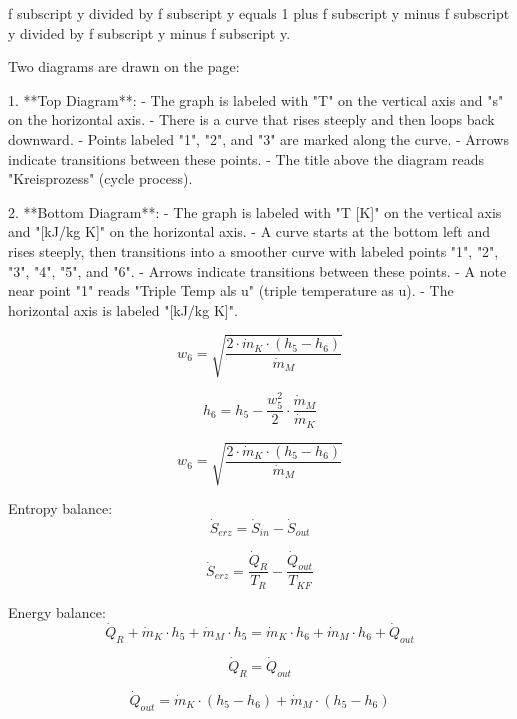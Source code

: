 f subscript y divided by f subscript y equals 1 plus f subscript y minus f subscript y divided by f subscript y minus f subscript y.

Two diagrams are drawn on the page:

1. **Top Diagram**:  
   - The graph is labeled with "T" on the vertical axis and "s" on the horizontal axis.  
   - There is a curve that rises steeply and then loops back downward.  
   - Points labeled "1", "2", and "3" are marked along the curve.  
   - Arrows indicate transitions between these points.  
   - The title above the diagram reads "Kreisprozess" (cycle process).

2. **Bottom Diagram**:  
   - The graph is labeled with "T [K]" on the vertical axis and "[kJ/kg K]" on the horizontal axis.  
   - A curve starts at the bottom left and rises steeply, then transitions into a smoother curve with labeled points "1", "2", "3", "4", "5", and "6".  
   - Arrows indicate transitions between these points.  
   - A note near point "1" reads "Triple Temp als u" (triple temperature as u).  
   - The horizontal axis is labeled "[kJ/kg K]".

\[ w_6 = \sqrt{\frac{2 \cdot \dot{m}_K \cdot (h_5 - h_6)}{\dot{m}_M}} \]  

\[ h_6 = h_5 - \frac{w_5^2}{2} \cdot \frac{\dot{m}_M}{\dot{m}_K} \]  

\[ w_6 = \sqrt{\frac{2 \cdot \dot{m}_K \cdot (h_5 - h_6)}{\dot{m}_M}} \]  

Entropy balance:  
\[ \dot{S}_{erz} = \dot{S}_{in} - \dot{S}_{out} \]  

\[ \dot{S}_{erz} = \frac{\dot{Q}_R}{T_R} - \frac{\dot{Q}_{out}}{T_{KF}} \]  

Energy balance:  
\[ \dot{Q}_R + \dot{m}_K \cdot h_5 + \dot{m}_M \cdot h_5 = \dot{m}_K \cdot h_6 + \dot{m}_M \cdot h_6 + \dot{Q}_{out} \]  

\[ \dot{Q}_R = \dot{Q}_{out} \]  

\[ \dot{Q}_{out} = \dot{m}_K \cdot (h_5 - h_6) + \dot{m}_M \cdot (h_5 - h_6) \]